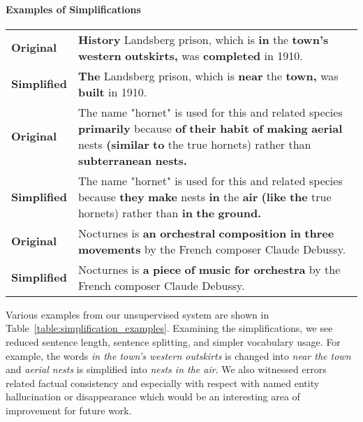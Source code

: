 \documentclass[11pt]{article}
\newcommand{\muss}{\textsc{MUSS}\xspace}
\begin{document}
\paragraph{Examples of Simplifications}
\begin{table*}[t]
\centering
\small
\begin{tabular}{@{}lp{}@{}}
\toprule


\textbf{Original} & \textbf{History} Landsberg prison, which is \textbf{in} the \textbf{town's} \textbf{western} \textbf{outskirts,} was \textbf{completed} in 1910. \\
\textbf{Simplified} & \textbf{The} Landsberg prison, which is \textbf{near} the \textbf{town,} was \textbf{built} in 1910. \\
\midrule


\textbf{Original} & The name "hornet" is used for this and related species \textbf{primarily} because \textbf{of} \textbf{their} \textbf{habit} \textbf{of} \textbf{making} \textbf{aerial} nests \textbf{(similar} \textbf{to} the true hornets) rather than \textbf{subterranean} \textbf{nests.} \\
\textbf{Simplified} & The name "hornet" is used for this and related species because \textbf{they} \textbf{make} nests \textbf{in} the \textbf{air} \textbf{(like} \textbf{the} true hornets) rather than \textbf{in} \textbf{the} \textbf{ground.} \\
\midrule
\textbf{Original} & Nocturnes is \textbf{an} \textbf{orchestral} \textbf{composition} \textbf{in} \textbf{three} \textbf{movements} by the French composer Claude Debussy. \\
\textbf{Simplified} & Nocturnes is \textbf{a} \textbf{piece} \textbf{of} \textbf{music} \textbf{for} \textbf{orchestra} by the French composer Claude Debussy. \\

\bottomrule
\end{tabular}
\caption{\textbf{Examples of Generated Simplifications.} We show simplifications generated by our best unsupervised model: \muss trained on mined data only. Bold highlights differences between original and simplified.}
\label{table:simplification_examples}
\end{table*} Various examples from our unsupervised system are shown in Table~\ref{table:simplification_examples}. Examining the simplifications, we see reduced sentence length, sentence splitting, and simpler vocabulary usage. For example, the words \textit{in the town's western outskirts} is changed into \textit{near the town} and \textit{aerial nests} is simplified into \textit{nests in the air}.
We also witnessed errors related factual consistency and especially with respect with named entity hallucination or disappearance which would be an interesting area of improvement for future work.
\end{document}
